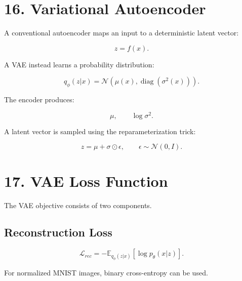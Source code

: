 \documentclass[10pt]{article}
\begin{document}
\section*{16. Variational Autoencoder}

A conventional autoencoder maps an input to a deterministic latent vector:

\[
z=f(x).
\]

A VAE instead learns a probability distribution:

\[
q_{\phi}(z|x)
=
\mathcal{N}
\left(
\mu(x),
\operatorname{diag}(\sigma^2(x))
\right).
\]

The encoder produces:

\[
\mu,\qquad \log\sigma^2.
\]

A latent vector is sampled using the reparameterization trick:

\[
z=\mu+\sigma\odot\epsilon,
\qquad
\epsilon\sim\mathcal{N}(0,I).
\]

\begin{center}
\end{center}

\section*{17. VAE Loss Function}

The VAE objective consists of two components.

\subsection*{Reconstruction Loss}

\[
\mathcal{L}_{rec}
=
-\mathbb{E}_{q_{\phi}(z|x)}
[\log p_{\theta}(x|z)].
\]

For normalized MNIST images, binary cross-entropy can be used.
\end{document}

